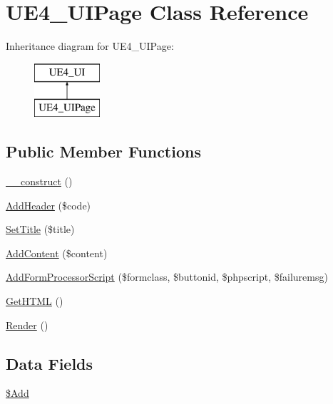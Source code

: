 \hypertarget{class_u_e4___u_i_page}{\section{U\-E4\-\_\-\-U\-I\-Page Class Reference}
\label{class_u_e4___u_i_page}
}
Inheritance diagram for U\-E4\-\_\-\-U\-I\-Page\-:\begin{figure}[H]
\begin{center}
\leavevmode
\includegraphics[height=2.000000cm]{class_u_e4___u_i_page}
\end{center}
\end{figure}
\subsection*{Public Member Functions}
\begin{DoxyCompactItemize}
\item 
\hyperlink{class_u_e4___u_i_page_a095c5d389db211932136b53f25f39685}{\-\_\-\-\_\-construct} ()
\item 
\hyperlink{class_u_e4___u_i_page_acb28932bc78f3a74986ab0ec961633bd}{Add\-Header} (\$code)
\item 
\hyperlink{class_u_e4___u_i_page_a9c1514ac8c26ee21b28f2fbef435fa47}{Set\-Title} (\$title)
\item 
\hyperlink{class_u_e4___u_i_page_a7fd6d1b0467b34de443953e2be12f13a}{Add\-Content} (\$content)
\item 
\hyperlink{class_u_e4___u_i_page_a747a80bc57b8f09e59d0b282771dee09}{Add\-Form\-Processor\-Script} (\$formclass, \$buttonid, \$phpscript, \$failuremsg)
\item 
\hyperlink{class_u_e4___u_i_page_abc99f9ea27a455eed49d783d5e03c4ad}{Get\-H\-T\-M\-L} ()
\item 
\hyperlink{class_u_e4___u_i_page_a1a6915de89093bc6383d7c1f18ab81e2}{Render} ()
\end{DoxyCompactItemize}
\subsection*{Data Fields}
\begin{DoxyCompactItemize}
\item 
\hyperlink{class_u_e4___u_i_page_a1272092d8cafe6175194a0693f651e0e}{\$\-Add}
\end{DoxyCompactItemize}


